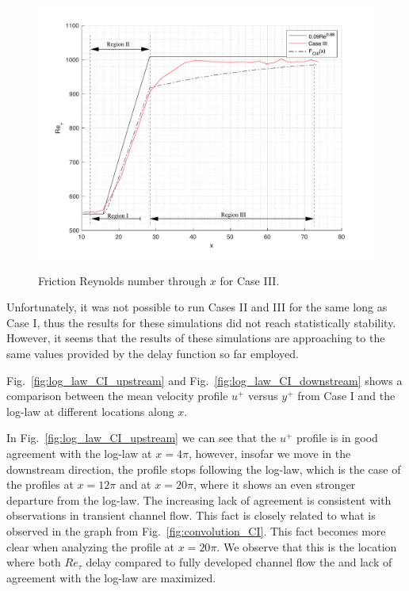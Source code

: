 \documentclass[twocolumn,10pt]{asme2e}
\begin{document}
\begin{figure}[t]
\centering
\scalebox{0.4}
{\includegraphics{convolution_CIII.pdf}}
\caption{Friction Reynolds number through \(x\) for Case III.}
\label{fig:convolution_CIII}
\end{figure}

Unfortunately, it was not possible to run Cases II and III for the same long as Case I, thus the results for these simulations did not reach statistically stability. However, it seems that the results of these simulations are approaching to the same values provided by the delay function so far employed.

Fig.~\ref{fig:log_law_CI_upstream} and Fig.~\ref{fig:log_law_CI_downstream} shows a comparison between the mean velocity profile \(u^+\) versus \(y^+\) from Case I and the log-law at different locations along \(x\).

In Fig.~\ref{fig:log_law_CI_upstream} we can see that the \(u^+\) profile is in good agreement with the log-law at \(x=4{\pi}\), however, insofar we move in the downstream direction, the profile stops following the log-law, which is the case of the profiles at \(x=12{\pi}\) and at \(x=20{\pi}\), where it shows an even stronger departure from the log-law. The increasing lack of agreement is consistent with observations in transient channel flow. This fact is closely related to what is observed in the graph from Fig.~\ref{fig:convolution_CI}. This fact becomes more clear when analyzing the profile at \(x=20{\pi}\). We observe  that this is the location where both \(Re_{\tau}\) delay compared to fully developed channel flow the and lack of agreement with the log-law are maximized.
\end{document}
